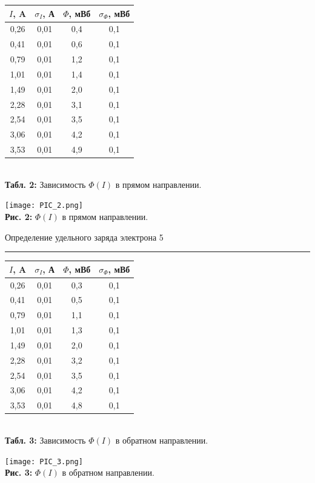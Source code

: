 \documentclass[12pt,a4paper]{scrartcl}
\begin{document}
  \begin{center}
  \begin{tabular}{|c|c|c|c|}
\hline
$I$, A & $\sigma_I$, А & $\Phi$, мВб & $\sigma_{\Phi}$, мВб \\ \hline
0,26 & 0,01 & 0,4 & 0,1 \\ \hline
0,41 & 0,01 & 0,6 & 0,1 \\ \hline
0,79 & 0,01 & 1,2 & 0,1 \\ \hline
1,01 & 0,01 & 1,4 & 0,1 \\ \hline
1,49 & 0,01 & 2,0 & 0,1 \\ \hline
2,28 & 0,01 & 3,1 & 0,1 \\ \hline
2,54 & 0,01 & 3,5 & 0,1 \\ \hline
3,06 & 0,01 & 4,2 & 0,1 \\ \hline
3,53 & 0,01 & 4,9 & 0,1 \\ \hline
\end{tabular}\\
  \textbf{Табл. 2:} Зависимость $\Phi (I)$ в прямом направлении.\\
  \end{center}
  
    \begin{center}
    \texttt{[image: PIC\_2.png]}\\
  \textbf{Рис. 2:} $\Phi (I)$ в прямом направлении.
  \end{center}
  
	\newpage
	
	\begin{flushleft}
		\footnotesize{Определение удельного заряда электрона} \hspace{\fill} \footnotesize{5}
		\\[-0.3cm]\noindent\rule{\textwidth}{0.3pt}
	\end{flushleft}  
  
  \begin{center}
\begin{tabular}{|c|c|c|c|}
\hline
$I$, A & $\sigma_I$, А & $\Phi$, мВб & $\sigma_{\Phi}$, мВб \\ \hline
0,26 & 0,01 & 0,3 & 0,1 \\ \hline
0,41 & 0,01 & 0,5 & 0,1 \\ \hline
0,79 & 0,01 & 1,1 & 0,1 \\ \hline
1,01 & 0,01 & 1,3 & 0,1 \\ \hline
1,49 & 0,01 & 2,0 & 0,1 \\ \hline
2,28 & 0,01 & 3,2 & 0,1 \\ \hline
2,54 & 0,01 & 3,5 & 0,1 \\ \hline
3,06 & 0,01 & 4,2 & 0,1 \\ \hline
3,53 & 0,01 & 4,8 & 0,1 \\ \hline
\end{tabular}\\
\textbf{Табл. 3:} Зависимость $\Phi (I)$ в обратном направлении.
  \end{center} 
 \begin{center}
    \texttt{[image: PIC\_3.png]}\\
  \textbf{Рис. 3:} $\Phi (I)$ в обратном направлении.
  \end{center}  
  
\end{document}
